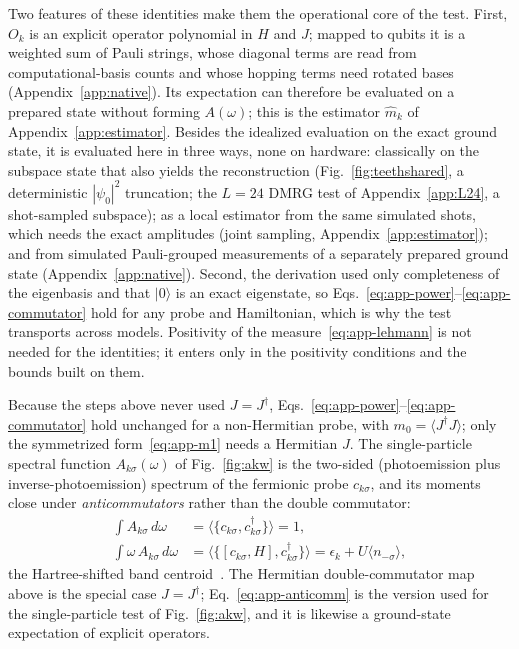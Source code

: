 \documentclass[submission, PhysCore]{SciPost}
\begin{document}
\begin{appendix}
Two features of these identities make them the operational core of the test. First, $O_k$ is an explicit operator polynomial in $H$ and $J$; mapped to qubits it is a weighted sum of Pauli strings, whose diagonal terms are read from computational-basis counts and whose hopping terms need rotated bases (Appendix~\ref{app:native}). Its expectation can therefore be evaluated on a prepared state without forming $A(\omega)$; this is the estimator $\widehat{m}_k$ of Appendix~\ref{app:estimator}. Besides the idealized evaluation on the exact ground state, it is evaluated here in three ways, none on hardware: classically on the subspace state that also yields the reconstruction (Fig.~\ref{fig:teethshared}, a deterministic $|\psi_0|^2$ truncation; the $L=24$ DMRG test of Appendix~\ref{app:L24}, a shot-sampled subspace); as a local estimator from the same simulated shots, which needs the exact amplitudes (joint sampling, Appendix~\ref{app:estimator}); and from simulated Pauli-grouped measurements of a separately prepared ground state (Appendix~\ref{app:native}). Second, the derivation used only completeness of the eigenbasis and that $|0\rangle$ is an exact eigenstate, so Eqs.~\eqref{eq:app-power}--\eqref{eq:app-commutator} hold for any probe and Hamiltonian, which is why the test transports across models. Positivity of the measure~\eqref{eq:app-lehmann} is not needed for the identities; it enters only in the positivity conditions and the bounds built on them.

Because the steps above never used $J=J^\dagger$, Eqs.~\eqref{eq:app-power}--\eqref{eq:app-commutator} hold unchanged for a non-Hermitian probe, with $m_0=\langle J^\dagger J\rangle$; only the symmetrized form~\eqref{eq:app-m1} needs a Hermitian $J$. The single-particle spectral function $A_{k\sigma}(\omega)$ of Fig.~\ref{fig:akw} is the two-sided (photoemission plus inverse-photoemission) spectrum of the fermionic probe $c_{k\sigma}$, and its moments close under \emph{anticommutators} rather than the double commutator:
\begin{equation}
\begin{aligned}
\int A_{k\sigma}\,d\omega&=\big\langle\{c_{k\sigma},c_{k\sigma}^\dagger\}\big\rangle=1,\\
\int \omega\,A_{k\sigma}\,d\omega&=\big\langle\{[c_{k\sigma},H],c_{k\sigma}^\dagger\}\big\rangle=\epsilon_k+U\langle n_{-\sigma}\rangle,
\end{aligned}
\label{eq:app-anticomm}
\end{equation}
the Hartree-shifted band centroid~\cite{Freericks2009}. The Hermitian double-commutator map above is the special case $J=J^\dagger$; Eq.~\eqref{eq:app-anticomm} is the version used for the single-particle test of Fig.~\ref{fig:akw}, and it is likewise a ground-state expectation of explicit operators.


\end{appendix}
\end{document}
